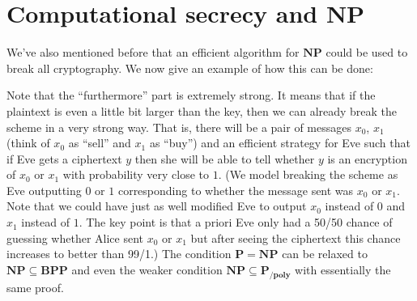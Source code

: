\section{Computational secrecy and
\(\mathbf{NP}\)}\label{Computational-secrecy-and}

We've also mentioned before that an efficient algorithm for
\(\mathbf{NP}\) could be used to break all cryptography. We now give an
example of how this can be done:

\hypertarget{breakingcryptowithnp}{}

Note that the ``furthermore'' part is extremely strong. It means that if
the plaintext is even a little bit larger than the key, then we can
already break the scheme in a very strong way. That is, there will be a
pair of messages \(x_0\), \(x_1\) (think of \(x_0\) as ``sell'' and
\(x_1\) as ``buy'') and an efficient strategy for Eve such that if Eve
gets a ciphertext \(y\) then she will be able to tell whether \(y\) is
an encryption of \(x_0\) or \(x_1\) with probability very close to
\(1\). (We model breaking the scheme as Eve outputting \(0\) or \(1\)
corresponding to whether the message sent was \(x_0\) or \(x_1\). Note
that we could have just as well modified Eve to output \(x_0\) instead
of \(0\) and \(x_1\) instead of \(1\). The key point is that a priori
Eve only had a 50/50 chance of guessing whether Alice sent \(x_0\) or
\(x_1\) but after seeing the ciphertext this chance increases to better
than 99/1.) The condition \(\mathbf{P}=\mathbf{NP}\) can be relaxed to
\(\mathbf{NP}\subseteq \mathbf{BPP}\) and even the weaker condition
\(\mathbf{NP} \subseteq \mathbf{P_{/poly}}\) with essentially the same
proof.


